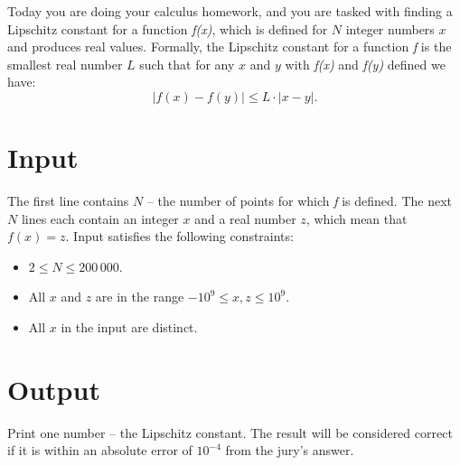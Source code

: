 
Today you are doing your calculus homework, and you are tasked with finding a Lipschitz constant for a function \textit{f(x)}, which
is defined for $N$ integer numbers $x$ and produces real values.
Formally, the Lipschitz constant for a function \textit{f} is the smallest real number $L$ such that for any $x$ and $y$ with \textit{f(x)} and \textit{f(y)} defined we have:
$$|f(x) - f(y)| \leq L \cdot |x - y|.$$

\section*{Input}
The first line contains $N$ -- the number of points for which \textit{f} is defined. The next $N$ lines each
contain an integer $x$ and a real number $z$, which mean that $f(x) = z$. Input satisfies the following constraints:
\begin{itemize}
	\item $2 \leq N \leq 200\,000$.
	\item All $x$ and $z$ are in the range $-10^9 \leq x,z \leq 10^9$.
	\item All $x$ in the input are distinct.
\end{itemize}


\section*{Output}
Print one number -- the Lipschitz constant. The result will be considered correct if it is within an absolute error of $10^{-4}$ from the jury's answer.
